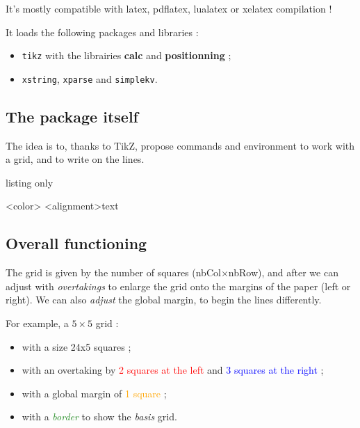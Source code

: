 \documentclass[a4paper]{article}
\newcommand\Cle[1]{{\bfseries\sffamily\textlangle #1\textrangle}}
\begin{document}
It’s mostly compatible with \textsf{latex}, \textsf{pdflatex}, \textsf{lualatex} or \textsf{xelatex} compilation !

\medskip

It loads the following packages and libraries :

\begin{itemize}
	\item \texttt{tikz} with the librairies \Cle{calc} and \Cle{positionning} ;
	\item \texttt{xstring}, \texttt{xparse} and \texttt{simplekv}.
\end{itemize}

\subsection{The package itself}

The idea is to, thanks to TikZ, propose commands and environment to work with a grid, and to write on the lines.

\begin{PresentationCode}{listing only}

\begin{EnvGrid}[keys]<color>
	\WriteLine[keys]<alignment>{text}
	\PassLine
\end{EnvGrid}
\end{PresentationCode}

\subsection{Overall functioning}

The grid is given by the number of squares (nbCol$\times$nbRow), and after we can adjust with \textit{overtakings} to enlarge the grid onto the margins of the paper (left or right). We can also \textit{adjust} the global margin, to begin the lines differently.

\medskip

For example, a $5\times5$ grid :

\begin{itemize}
	\item with a size 24x5 squares ;
	\item with an overtaking by \textcolor{red}{2 squares at the left} and \textcolor{blue}{3 squares at the right} ;
	\item with a global margin of \textcolor{orange}{1 square} ;
	\item with a \textcolor{ForestGreen}{\textit{border}} to show the \textit{basis} grid.
\end{itemize}
\end{document}
